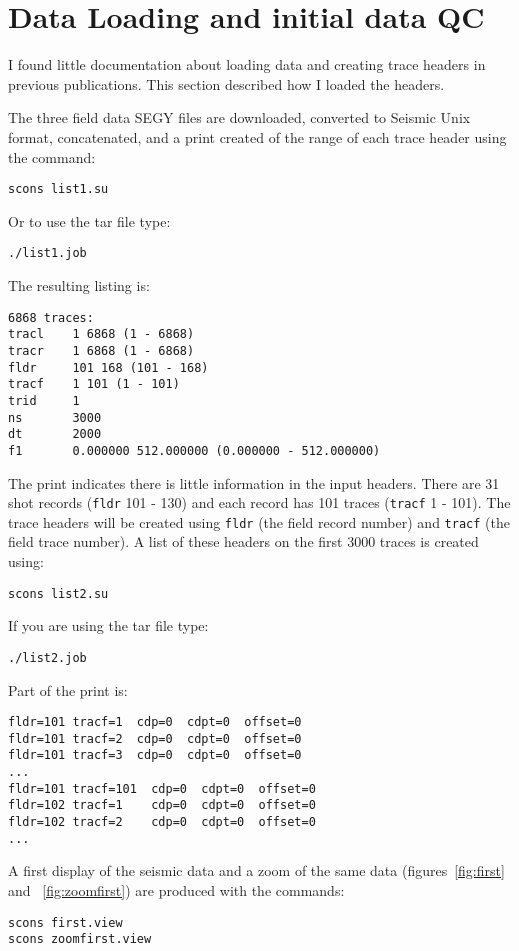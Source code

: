 \section{Data Loading and initial data QC}

I found little documentation about loading data and creating trace
headers in previous publications.  This section described how I loaded 
the headers.

The three field data SEGY files are downloaded, converted to Seismic 
Unix format, concatenated, and a print created of the range of each trace 
header using the command:
\begin{verbatim}
scons list1.su
\end{verbatim}
Or to use the tar file type:
\begin{verbatim}
./list1.job
\end{verbatim}

The resulting listing is:
\begin{verbatim}
6868 traces:
tracl    1 6868 (1 - 6868)
tracr    1 6868 (1 - 6868)
fldr     101 168 (101 - 168)
tracf    1 101 (1 - 101)
trid     1
ns       3000
dt       2000
f1       0.000000 512.000000 (0.000000 - 512.000000)
\end{verbatim}

The print indicates there is little information in the input headers.
There are 31 shot records (\texttt{fldr} 101 - 130) and each record has 101
traces (\texttt{tracf} 1 - 101).  The trace headers will be created using \texttt{fldr}
(the field record number) and \texttt{tracf} (the field trace number).  A list 
of these headers on the first 3000 traces is created using:
\begin{verbatim}
scons list2.su 
\end{verbatim}

If you are using the tar file type:
\begin{verbatim}
./list2.job
\end{verbatim}

Part of the print is: 
\begin{verbatim}
fldr=101 tracf=1  cdp=0	 cdpt=0  offset=0 
fldr=101 tracf=2  cdp=0	 cdpt=0  offset=0 	
fldr=101 tracf=3  cdp=0  cdpt=0  offset=0 
... 
fldr=101 tracf=101  cdp=0  cdpt=0  offset=0 
fldr=102 tracf=1    cdp=0  cdpt=0  offset=0 
fldr=102 tracf=2    cdp=0  cdpt=0  offset=0 
...
\end{verbatim}

A first display of the seismic data and a zoom of the same data 
(figures~\ref{fig:first} and ~\ref{fig:zoomfirst}) are
produced with the commands: 
\begin{verbatim}
scons first.view 
scons zoomfirst.view
\end{verbatim}

